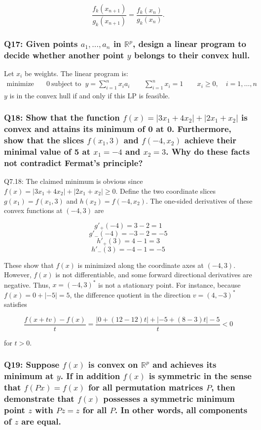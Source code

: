 \documentclass[8pt]{article}
\begin{document}
{{\[
\frac{f_k(x_{n+1})}{g_k(x_{n+1})} = \frac{f_k(x_n)}{g_k(x_n)}.
\]

\subsubsection*{Q17: Given points \( a_1, \ldots, a_n \) in \( \mathbb{R}^p \), design a linear program to decide whether another point \( y \) belongs to their convex hull.}

Let $x_i$ be weights. The linear program is:
\begin{align*}
\text{minimize} & \quad 0 \
\text{subject to} & \quad y = \sum_{i=1}^n x_i a_i \
& \quad \sum_{i=1}^n x_i = 1 \
& \quad x_i \geq 0, \quad i = 1,\ldots,n
\end{align*}
$y$ is in the convex hull if and only if this LP is feasible.

\subsubsection*{Q18: Show that the function \( f(x) = |3x_1 + 4x_2| + |2x_1 + x_2| \) is convex and attains its minimum of 0 at 0. Furthermore, show that the slices \( f(x_1, 3) \) and \( f(-4, x_2) \) achieve their minimal value of 5 at \( x_1 = -4 \) and \( x_2 = 3 \). Why do these facts not contradict Fermat’s principle?}

Q7.18: The claimed minimum is obvious since \( f(x) = |3x_1 + 4x_2| + |2x_1 + x_2| \geq 0 \). Define the two coordinate slices \( g(x_1) = f(x_1, 3) \) and \( h(x_2) = f(-4, x_2) \). The one-sided derivatives of these convex functions at \((-4, 3)\) are

\[
g'_{+}(-4) = 3 - 2 = 1
\]
\[
g'_{-}(-4) = -3 - 2 = -5
\]
\[
h'_{+}(3) = 4 - 1 = 3
\]
\[
h'_{-}(3) = -4 - 1 = -5
\]

These show that \( f(x) \) is minimized along the coordinate axes at \((-4, 3)\). However, \( f(x) \) is not differentiable, and some forward directional derivatives are negative. Thus, \( x = (-4, 3)^* \) is not a stationary point. For instance, because \( f(x) = 0 + | -5 | = 5 \), the difference quotient in the direction \( v = (4, -3)^* \) satisfies

\[
\frac{f(x + tv) - f(x)}{t} = \frac{|0 + (12 - 12)t| + | -5 + (8 - 3)t| - 5}{t} < 0
\]

for \( t > 0 \).

\subsubsection*{Q19: Suppose \( f(x) \) is convex on \( \mathbb{R}^p \) and achieves its minimum at \( y \). If in addition \( f(x) \) is symmetric in the sense that \( f(Px) = f(x) \) for all permutation matrices \( P \), then demonstrate that \( f(x) \) possesses a symmetric minimum point \( z \) with \( Pz = z \) for all \( P \). In other words, all components of \( z \) are equal.}

}}
\end{document}
